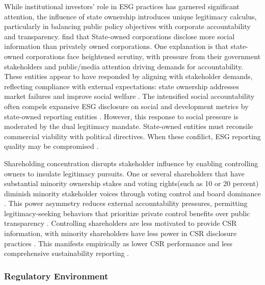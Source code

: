 \documentclass[
  authoryear]{elsarticle}
\begin{document}
While institutional investors' role in ESG practices has garnered
significant attention, the influence of state ownership introduces
unique legitimacy calculus, particularly in balancing public policy
objectives with corporate accountability and transparency.
\citet{TAGESSON2009} find that State-owned corporations disclose more
social information than privately owned corporations. One explanation is
that state-owned corporations face heightened scrutiny, with pressure
from their government stakeholders and public/media attention driving
demands for accountability. These entities appear to have responded by
aligning with stakeholder demands, reflecting compliance with external
expectations: state ownership addresses market failures and improve
social welfare \citep[see][]{STIGLITZ1993}. The intensified social
accountability often compels expansive ESG disclosure on social and
development metrics by state-owned reporting entities
\citep{TAGESSON2009, ZHOU2019, BOSE2018}. However, this response to
social pressure is moderated by the dual legitimacy mandate. State-owned
entities must reconsile commercial viability with political directives.
When these confilict, ESG reporting quality may be compromised
\citep{RAIMO2020}.

Shareholding concentration disrupts stakeholder influence by enabling
controlling owners to insulate legitimacy pursuits. One or several
shareholders that have substantial minority ownership stakes and voting
rights(such as 10 or 20 percent) diminish minority stakeholder voices
through voting control and board dominance \citep{SHLEIFER1997}. This
\hspace{0pt}power asymmetry\hspace{0pt} reduces external accountability
pressures, permitting legitimacy-seeking behaviors that prioritize
private control benefits over public transparency
\citep{SMITH2022, DUCASSY2015}. Controlling shareholders are less
motivated to provide CSR information, with minority shareholders have
less power in CSR disclosure practices \citep{SMITH2022, BORGES2024}.
This manifests empirically as lower CSR performance and less
comprehensive sustainability reporting \citep{LAU2016}.

\subsubsection{Regulatory Environment}\label{regulatory-environment}
\end{document}
